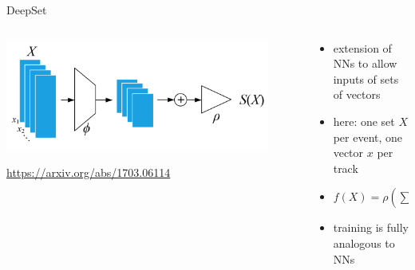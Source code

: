 \documentclass[aspectratio=1610, 10pt]{beamer}
\begin{document}
\begin{frame}{DeepSet}
  \begin{columns}
    \begin{column}{0.5\textwidth}
      \centering
      \includegraphics[width=0.9\textwidth]{images/DeepSet_schematic.png}

      \tiny \url{https://arxiv.org/abs/1703.06114}
    \end{column}
    \begin{column}{0.5\textwidth}
      \begin{itemize}
        \item extension of NNs to allow inputs of sets of vectors
        \item here: one set $X$ per event, one vector $x$ per track
        \item $f(X) = \rho \left( \sum_{x \in X} \phi(x) \right)$
        \item training is fully analogous to NNs
      \end{itemize}
    \end{column}
  \end{columns}
\end{frame}
\end{document}
